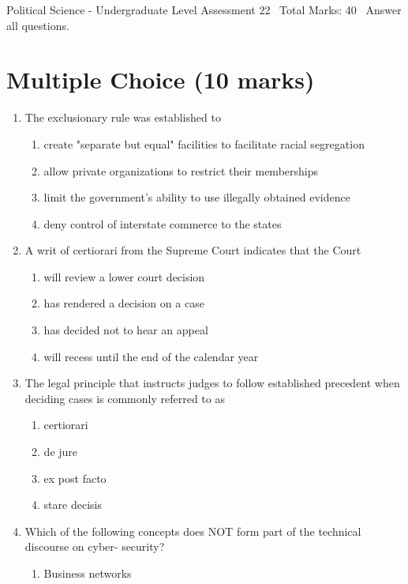 \documentclass[12pt]{article}
\begin{document}
\begin{center}
Political Science - Undergraduate Level Assessment 22 \
Total Marks: 40 \
Answer all questions.
\end{center}

\section*{Multiple Choice (10 marks)}
\begin{enumerate}[label=\arabic*.]
\item The exclusionary rule was established to
\begin{enumerate}[label=(\alph*)]
    \item create "separate but equal" facilities to facilitate racial segregation
    \item allow private organizations to restrict their memberships
    \item limit the government's ability to use illegally obtained evidence
    \item deny control of interstate commerce to the states
\end{enumerate}
\item A writ of certiorari from the Supreme Court indicates that the Court
\begin{enumerate}[label=(\alph*)]
    \item will review a lower court decision
    \item has rendered a decision on a case
    \item has decided not to hear an appeal
    \item will recess until the end of the calendar year
\end{enumerate}
\item The legal principle that instructs judges to follow established precedent when deciding cases is commonly referred to as
\begin{enumerate}[label=(\alph*)]
    \item certiorari
    \item de jure
    \item ex post facto
    \item stare decisis
\end{enumerate}
\item Which of the following concepts does NOT form part of the technical discourse on cyber- security?
\begin{enumerate}[label=(\alph*)]
    \item Business networks

\end{enumerate}
\end{enumerate}
\end{document}
